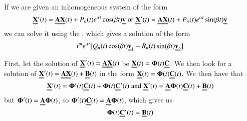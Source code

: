 

\begin{definition}
        If we are given an inhomogeneous system of the form \begin{equation}
                \Emph{X}'(t) = \Emph{A}\Emph{X}(t) + P_n(t)e^{\alpha t}\cos(\beta t)\Emph{v}\;\text{or}\;\Emph{X}'(t) = \Emph{A}\Emph{X}(t) + P_n(t)e^{\alpha t}\sin(\beta t)\Emph{v}
        \end{equation}
        we can solve it using the , which gives a solution of the form \begin{equation}
                t^me^{\alpha t}[Q_n(t)\cos(\beta t)\Emph{v}_1 + R_n(t)\sin(\beta t)\Emph{v}_2]
        \end{equation}
\end{definition}



\begin{definition}
        First, let the solution of $\Emph{X}'(t) = \Emph{A}\Emph{X}(t)$ be $\Emph{X}(t) = \boldsymbol{\Phi}(t)\Emph{C}$. We then look for a solution of $\Emph{X}'(t) = \Emph{A}\Emph{X}(t) + \Emph{B}(t)$ in the form $\Emph{X}(t) = \boldsymbol{\Phi}(t)\Emph{C}(t)$. We then have that $$\Emph{X}'(t) = \boldsymbol{\Phi}'(t)\Emph{C}(t) + \boldsymbol{\Phi}(t)\Emph{C}'(t)\;\text{and}\;\Emph{X}'(t) = \Emph{A}\boldsymbol{\Phi}(t)\Emph{C}(t)+\Emph{B}(t)$$ but $\boldsymbol{\Phi}'(t) = \Emph{A}\boldsymbol{\Phi}(t)$, so $\boldsymbol{\Phi}'(t)\Emph{C}(t) = \Emph{A}\boldsymbol{\Phi}(t)$, which gives us \begin{equation}
                \boldsymbol{\Phi}(t)\Emph{C}'(t) = \Emph{B}(t)
        \end{equation}
\end{definition}

